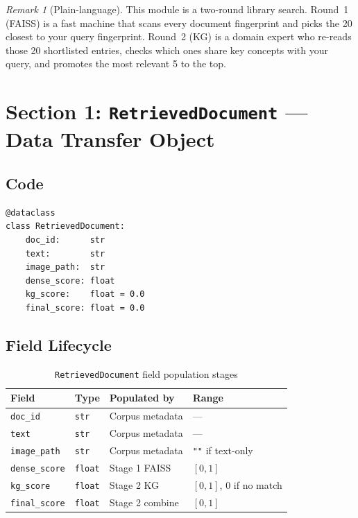 \documentclass[12pt,a4paper]{article}
\theoremstyle{definition}
\theoremstyle{remark}
\newtheorem{remark}[theorem]{Remark}
\begin{document}
\begin{remark}[Plain-language]
This module is a two-round library search.
Round~1 (FAISS) is a fast machine that scans every document fingerprint
and picks the 20 closest to your query fingerprint.
Round~2 (KG) is a domain expert who re-reads those 20 shortlisted entries,
checks which ones share key concepts with your query, and promotes the
most relevant 5 to the top.
\end{remark}

\section{Section 1: \texttt{RetrievedDocument} --- Data Transfer Object}

\subsection{Code}

\begin{lstlisting}[caption={\texttt{RetrievedDocument} dataclass}]
@dataclass
class RetrievedDocument:
    doc_id:      str
    text:        str
    image_path:  str
    dense_score: float
    kg_score:    float = 0.0
    final_score: float = 0.0
\end{lstlisting}

\subsection{Field Lifecycle}

\begin{table}[H]
\centering
\caption{\texttt{RetrievedDocument} field population stages}
\begin{tabularx}{\textwidth}{llXl}
\toprule
Field & Type & Populated by & Range \\
\midrule
\texttt{doc\_id}     & \texttt{str}   & Corpus metadata  & --- \\
\texttt{text}        & \texttt{str}   & Corpus metadata  & --- \\
\texttt{image\_path} & \texttt{str}   & Corpus metadata  & \texttt{""} if text-only \\
\texttt{dense\_score}& \texttt{float} & Stage 1 FAISS    & $[0, 1]$ \\
\texttt{kg\_score}   & \texttt{float} & Stage 2 KG       & $[0, 1]$, $0$ if no match \\
\texttt{final\_score}& \texttt{float} & Stage 2 combine  & $[0, 1]$ \\
\bottomrule
\end{tabularx}
\end{table}
\end{document}

